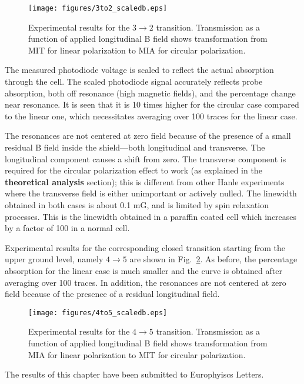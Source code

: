 \begin{figure}
	\centering
	\texttt{[image: figures/3to2\_scaledb.eps]}
	\caption{Experimental results for the $3\rightarrow 2 $ transition. Transmission as a function of applied longitudinal B field shows transformation from MIT for linear polarization to MIA for circular polarization.}
	\label{fig:3to2}
\end{figure}

The measured photodiode voltage is scaled to reflect the actual absorption through the cell. The scaled photodiode signal accurately reflects probe absorption, both off resonance (high magnetic fields), and the percentage change near resonance. It is seen that it is 10 times higher for the circular case compared to the linear one, which necessitates averaging over 100 traces for the linear case.

The resonances are not centered at zero field because of the presence of a small residual B field inside the shield---both longitudinal and transverse. The longitudinal component causes a shift from zero. The transverse component is required for the circular polarization effect to work (as explained in the \textbf{theoretical analysis} section); this is different from other Hanle experiments where the transverse field is either unimportant or actively nulled. The linewidth obtained in both cases is about 0.1 mG, and is limited by spin relaxation processes. This is the linewidth obtained in a paraffin coated cell which increases by a factor of 100 in a normal cell.

Experimental results for the corresponding closed transition starting from the upper ground level, namely $ 4 \rightarrow 5 $ are shown in Fig.\ \ref{fig:4to5}. As before, the percentage absorption for the linear case is much smaller and the curve is obtained after averaging over 100 traces. In addition, the resonances are not centered at zero field because of the presence of a residual longitudinal field.

\begin{figure}
	\centering
	\texttt{[image: figures/4to5\_scaledb.eps]}
	\caption{Experimental results for the $ 4\rightarrow 5 $ transition. Transmission as a function of applied longitudinal B field shows transformation from MIA for linear polarization to MIT for circular polarization.}
	\label{fig:4to5}
\end{figure}

The results of this chapter have been submitted to Europhyiscs Letters.

